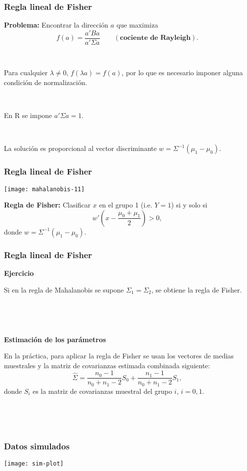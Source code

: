 \documentclass{beamer}
\begin{document}
\begin{frame}[plain]
\frametitle{Regla lineal de Fisher}

\textbf{Problema:} Encontrar la dirección $a$ que maximiza
\[
f(a) = \frac{a'Ba}{a'\Sigma a}\qquad (\textbf{cociente de Rayleigh}).
\]

\

Para cualquier $\lambda\ne 0$, $f(\lambda a) =f(a)$, por lo que
es necesario imponer alguna condici\'{o}n de normalizaci\'{o}n. 

\

En R se impone $a'\Sigma a=1$.

\

La soluci\'{o}n es proporcional al vector discriminante $w=\Sigma^{-1}(\mu_1-\mu_0)$.



\end{frame}
\begin{frame}[plain]
\frametitle{Regla lineal de Fisher}

\centerline{{\texttt{[image: mahalanobis-11]}}}

\textbf{Regla de Fisher:} Clasificar $x$ en el grupo 1 (i.e. $Y=1$) si y solo si
\[
w'\left(x-\frac{\mu_0 + \mu_1}{2}\right)>0,
\]
donde $w=\Sigma^{-1}(\mu_1-\mu_0).$

\end{frame}
\begin{frame}[plain]
\frametitle{Regla lineal de Fisher}

\textbf{Ejercicio} 

Si en la regla de Mahalanobis se supone $\Sigma_1=\Sigma_2$, se obtiene la regla de Fisher.


\

\

\textbf{Estimación de los parámetros}

En la práctica, para aplicar la regla de Fisher se usan los vectores de medias muestrales y la matriz de covarianzas estimada combinada siguiente:
\[
\hat{\Sigma} = \frac{n_0-1}{n_0+n_1-2} S_0  + \frac{n_1-1}{n_0+n_1-2} S_1,
\]
donde $S_i$ es la matriz de covarianzas muestral del grupo $i$, $i=0,1$.

\




\

 

\end{frame}
\begin{frame}
\frametitle{Datos simulados}

\centerline{\texttt{[image: sim-plot]}}

\end{frame}
\end{document}
